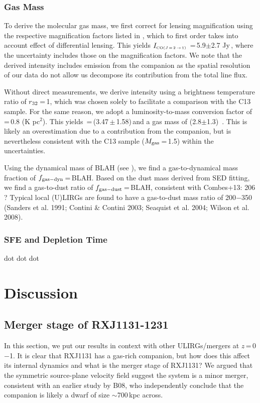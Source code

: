 \documentclass[]{emulateapj}
\begin{document}
\subsubsection{Gas Mass}
To derive the molecular gas mass, we first correct for lensing magnification
using the respective magnification factors listed in , which to
first order takes into account effect of differential lensing. This yields
$I_{\tiny \mbox{CO($J$\,=\,2\,$\rightarrow$\,1) }}$\,=\,5.9$\pm$2.7 Jy\,\kms, where the uncertainty includes those on
the magnification factors.
We note that the derived intensity includes emission from the companion
as the spatial resolution of our data do not allow us decompose its contribution
from the total line flux.

Without direct  measurements,
we derive  intensity
using a brightness temperature ratio of $r_{\rm 32}$\,=\,1, which was chosen
solely to facilitate a comparison with the C13 sample. For the same reason, we
adopt a luminosity-to-mass conversion factor of
\alphaco\,=\,0.8 (K \kms pc$^2$)\pmOne. This yields
\Lp\,=\,(3.47\,$\pm$\,1.58)\,\Lsun and a gas mass
of (2.8$\pm$1.3)\, \Msun. This is likely
an overestimation due to a contribution from the companion, but is
nevertheless consistent with the C13 sample ($M_{\rm gas}$\,=\,1.5\Msun) within the
uncertainties.

Using the dynamical mass of BLAH (see ), we find
a gas-to-dynamical mass fraction of $f_{\rm gas-dyn}$\,=\,BLAH.
Based on the dust mass derived from SED fitting, we find a gas-to-dust ratio of
$f_{\rm gas-dust}$\,=\,BLAH, consistent with Combes+13: 206 ?
 Typical local (U)LIRGs are found to have a
gas-to-dust mass ratio of 200$-$350 (Sanders et al. 1991; Contini
\& Contini 2003; Seaquist et al. 2004; Wilson et al. 2008).

\subsubsection{SFE and Depletion Time}
dot dot dot


\section{Discussion}
\subsection{Merger stage of RXJ1131-1231}
In this section, we put our results in context with other ULIRGs/mergers at
$z$\,=\,0$-$1. It is clear that RXJ1131 has a gas-rich companion, but how does
this affect its internal dynamics and what is the merger stage of RXJ1131?
We argued that the symmetric source-plane velocity field suggest
the system is a minor merger, consistent with an earlier study by B08, who
independently conclude that the companion is likely
a dwarf of size $\sim$700\,kpc across.
\end{document}
